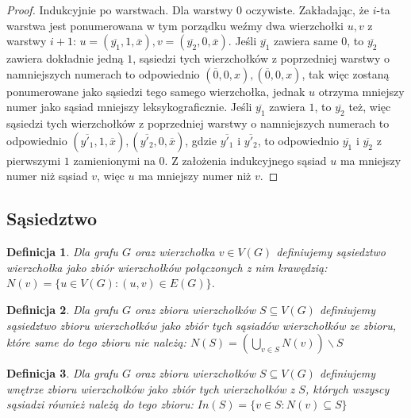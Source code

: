 \documentclass{pracamgr}
\newtheorem{defi}{Definicja}[section] %
\begin{document}
    \begin{proof}
     Indukcyjnie po warstwach.\newline
     Dla warstwy $0$ oczywiste.\newline
     Zakładając, że $i$-ta warstwa jest ponumerowana w tym porządku weźmy dwa wierzchołki $u,v$ z warstwy $i+1$:
     $u=(\overline{y_1},1,\overline{x}),v=(\overline{y_2},0,\overline{x})$.\newline
     Jeśli $\overline{y_1}$ zawiera same $0$, to $\overline{y_2}$ zawiera dokładnie jedną $1$, sąsiedzi tych wierzchołków z poprzedniej warstwy
     o namniejszych numerach to odpowiednio $(\overline{0},0,x),(\overline{0},0,x)$,
     tak więc zostaną ponumerowane jako sąsiedzi tego samego wierzchołka, jednak $u$ otrzyma mniejszy numer jako sąsiad mniejszy leksykograficznie.\newline
     Jeśli $\overline{y_1}$ zawiera $1$, to $\overline{y_2}$ też, więc sąsiedzi tych wierzchołków z poprzedniej warstwy
     o namniejszych numerach to odpowiednio $(\overline{y'_1},1,\overline{x}),(\overline{y'_2},0,\overline{x})$, gdzie $\overline{y'_1}$ i $\overline{y'_2}$,
     to odpowiednio $\overline{y_1}$ i $\overline{y_2}$ z pierwszymi $1$ zamienionymi na $0$. Z założenia indukcyjnego sąsiad $u$ ma mniejszy numer niż sąsiad $v$,
     więc $u$ ma mniejszy numer niż $v$.
    \end{proof}
   \subsection{Sąsiedztwo}
    \begin{defi}\label{sasiedztwo wierzcholka}
     Dla grafu $G$ oraz wierzchołka $v\in V(G)$ definiujemy \emph{sąsiedztwo wierzchołka} jako zbiór wierzchołków połączonych z nim krawędzią:
     $N(v)=\{u\in V(G):(u,v)\in E(G)\}$.
    \end{defi}
    \begin{defi}\label{sasiedztwo zbioru wierzcholkow}%
     Dla grafu $G$ oraz zbioru wierzchołków $S\subseteq V(G)$ definiujemy \emph{sąsiedztwo zbioru wierzchołków} jako zbiór tych sąsiadów wierzchołków ze zbioru,
     które same do tego zbioru nie należą: $N(S)=(\bigcup_{v\in S}N(v))\backslash S$
    \end{defi}
    \begin{defi}\label{wnetrze zbioru wierzcholkow}
     Dla grafu $G$ oraz zbioru wierzchołków $S\subseteq V(G)$ definiujemy \emph{wnętrze zbioru wierzchołków} jako zbiór tych wierzchołków z $S$,
     których wszyscy sąsiadzi również należą do tego zbioru: $In(S)=\{v\in S:N(v)\subseteq S\}$
    \end{defi}
\end{document}
